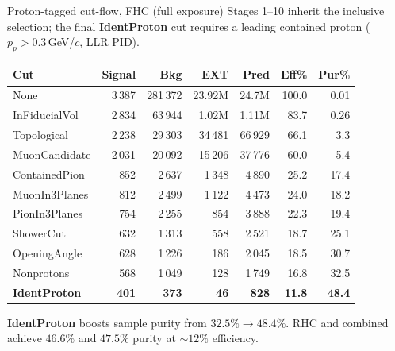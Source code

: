 \documentclass[aspectratio=169,10pt]{beamer}
\begin{document}
\begin{frame}{Proton-tagged cut-flow, FHC (full exposure)}
  \footnotesize
  Stages 1--10 inherit the inclusive selection; the final \textbf{IdentProton} cut requires a leading contained proton ($p_p > 0.3$\,GeV/$c$, LLR PID).
  \begin{center}\scriptsize
  \begin{tabular}{lrrrrrr}
  \toprule
  Cut & Signal & Bkg & EXT & Pred & Eff\% & Pur\%\\\midrule
  None          & 3\,387 & 281\,372 & 23.92M & 24.7M & 100.0 & 0.01\\
  InFiducialVol & 2\,834 & 63\,944 & 1.02M & 1.11M & 83.7 & 0.26\\
  Topological   & 2\,238 & 29\,303 & 34\,481 & 66\,929 & 66.1 & 3.3\\
  MuonCandidate & 2\,031 & 20\,092 & 15\,206 & 37\,776 & 60.0 & 5.4\\
  ContainedPion & 852 & 2\,637 & 1\,348 & 4\,890 & 25.2 & 17.4\\
  MuonIn3Planes & 812 & 2\,499 & 1\,122 & 4\,473 & 24.0 & 18.2\\
  PionIn3Planes & 754 & 2\,255 & 854 & 3\,888 & 22.3 & 19.4\\
  ShowerCut     & 632 & 1\,313 & 558 & 2\,521 & 18.7 & 25.1\\
  OpeningAngle  & 628 & 1\,226 & 186 & 2\,045 & 18.5 & 30.7\\
  Nonprotons    & 568 & 1\,049 & 128 & 1\,749 & 16.8 & 32.5\\
  \textbf{IdentProton} & \textbf{401} & \textbf{373} & \textbf{46} & \textbf{828} & \textbf{11.8} & \textbf{48.4}\\
  \bottomrule
  \end{tabular}
  \end{center}
  {\scriptsize \textbf{IdentProton} boosts sample purity from $32.5\%\to48.4\%$. RHC and combined achieve $46.6\%$ and $47.5\%$ purity at $\sim\!12\%$ efficiency.}
\end{frame}
\end{document}

